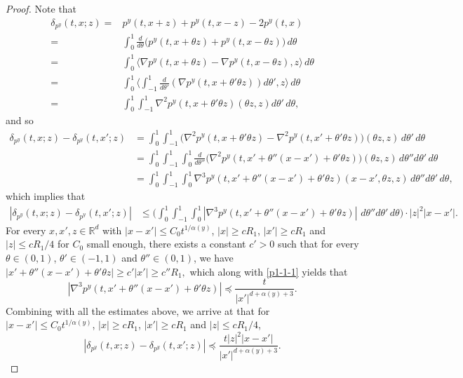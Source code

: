 \documentclass[a4paper,11pt]{amsart}
\renewcommand{\le}{\leqslant}
\renewcommand{\ge}{\geqslant}
\newcommand{\R}{\mathds R}
\newcommand{\p}{\preceq}
\newcommand{\A}{\alpha}
\theoremstyle{definition}
\begin{document}
\begin{proof}
Note that \begin{equation}\label{e:conpr0}
\begin{split} \delta_{p^y}(t,x;z)=&p^y(t,x+z)+p^y(t,x-z)-2p^y(t,x)\\
=&\int_0^1 \frac{d}{d\theta}\Big(p^y(t,x+\theta z)+p^y(t,x-\theta z)\Big)\,d\theta\\
=&\int_0^1 \langle \nabla p^y(t,x+\theta z)-\nabla p^y(t,x-\theta z),z\rangle \,d\theta\\
=&\int_0^1 \Big\langle \int_{-1}^1 \frac{d}{d \theta'}\left(\nabla p^y(t,x+\theta'\theta z)\right)d\theta',z \Big\rangle \,d\theta\\
=&\int_0^1\int_{-1}^1 \nabla^2 p^y(t,x+\theta'\theta z)(\theta z, z)d\theta'\,d\theta,\end{split}\end{equation}
and so
\begin{align*}  \delta_{p^y}(t,x;z)-\delta_{p^y}(t,x';z)
&=\int_0^1\int_{-1}^1 \big(\nabla^2 p^y(t,x+\theta'\theta z)- \nabla^2 p^y(t,x'+\theta'\theta z)\big)(\theta z, z)\,d\theta'\,d\theta\\
&=\int_0^1\int_{-1}^1\int_0^1  \frac{d}{d\theta''}\Big(\nabla^2 p^y(t,x'+\theta''(x-x')+\theta'\theta z)\Big)
(\theta z, z)\,d\theta''d\theta'\,d\theta\\
&=\int_0^1\int_{-1}^1\int_0^1  \nabla^3 p^y(t,x'+\theta''(x-x')+\theta'\theta z)
(x-x',\theta z, z)\,d\theta''d\theta'\,d\theta,\end{align*} which implies that
\begin{align*}
 |\delta_{p^y}(t,x;z)-\delta_{p^y}(t,x';z) |
&\le \Big(\int_0^1\int_{-1}^1\int_0^1 |\nabla^3 p^y(t,x'+\theta''(x-x')+\theta'\theta z)|\,\,d\theta''d\theta'\,d\theta\Big)
\cdot |z|^2|x-x'|.
\end{align*}
For every $x,x',z\in\R^d$ with $|x-x'|\le C_0 t^{{1/\A(y)}}$, $|x|\ge cR_1$, $|x'|\ge cR_1$ and $|z|\le {cR_1}/{4}$
for $C_0$ small enough, there exists a constant $c'>0$ such that for every $\theta\in(0,1)$, $\theta'\in(-1,1)$ and $\theta''\in(0,1)$, we have
$|x'+\theta''(x-x')+\theta'\theta z|\ge c'|x'|\ge c''R_1,$ which along with \eqref{p1-1-1} yields that
$$|\nabla^3 p^y(t,x'+\theta''(x-x')+\theta'\theta z)| \p \frac{t}{|x'|^{d+\A(y)+3}}.$$ Combining with all the estimates above, we arrive at that
for $|x-x'|\le C_0t^{1/\A(y)}$, $|x|\ge cR_1$, $|x'|\ge cR_1$ and $|z|\le {cR_1}/{4}$,
\begin{equation}\label{e:conpr1} |\delta_{p^y}(t,x;z)-\delta_{p^y}(t,x';z) |\p \frac{t|z|^2|x-x'|}{|x'|^{d+\A(y)+3}}.
   \end{equation}



\end{proof}
\end{document}
